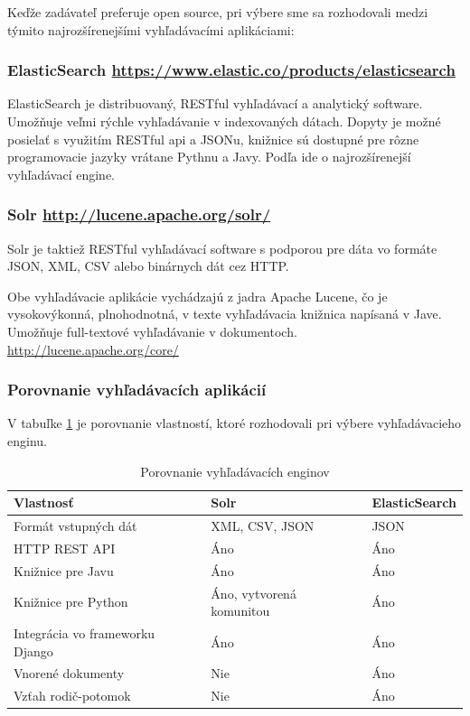 \documentclass[thesis=M,slovak]{FITthesis}[2013/05/06]
\begin{document}
Keďže zadávateľ preferuje open source, pri výbere sme sa rozhodovali medzi týmito najrozšírenejšími vyhľadávacími aplikáciami:
\subsubsection{ElasticSearch \url{https://www.elastic.co/products/elasticsearch}}

ElasticSearch je distribuovaný, RESTful vyhľadávací a analytický software. Umožňuje veľmi rýchle vyhľadávanie v indexovaných dátach. Dopyty je možné posielať s využitím RESTful api a JSONu, knižnice sú dostupné pre rôzne programovacie jazyky vrátane Pythnu a Javy. Podľa \cite{NajpouzivanejsieVyhladavace} ide o najrozšírenejší vyhľadávací engine.

\subsubsection{Solr \url{http://lucene.apache.org/solr/}}

Solr je taktiež RESTful vyhľadávací software s podporou pre dáta vo formáte JSON, XML, CSV alebo binárnych dát cez HTTP.

Obe vyhľadávacie aplikácie vychádzajú z jadra Apache Lucene, čo je vysokovýkonná, plnohodnotná, v texte vyhľadávacia knižnica napísaná v Jave. Umožňuje full-textové vyhľadávanie v dokumentoch. \url{http://lucene.apache.org/core/}

\subsubsection{Porovnanie vyhľadávacích aplikácií}
V tabuľke \ref{tab:searchEngines} je porovnanie vlastností, ktoré rozhodovali pri výbere vyhľadávacieho enginu.

\begin{table}[!htbp]\centering
 	\caption[ElasticSearch vs. Solr]{Porovnanie vyhľadávacích enginov}\label{tab:searchEngines}
\begin{tabularx}{\textwidth}{|l|X|X|} \hline
Vlastnosť & Solr                         & ElasticSearch \\ \hline
Formát vstupných dát   & XML, CSV, JSON	 & JSON \\ \hline
HTTP REST API & Áno & Áno \\ \hline
Knižnice pre Javu & Áno & Áno \\ \hline
Knižnice pre Python & Áno, vytvorená komunitou & Áno \\ \hline
Integrácia vo frameworku Django & Áno & Áno \\ \hline
Vnorené dokumenty & Nie & Áno \\ \hline
Vzťah rodič-potomok & Nie & Áno \\ \hline
\end{tabularx}
\end{table}
\end{document}
